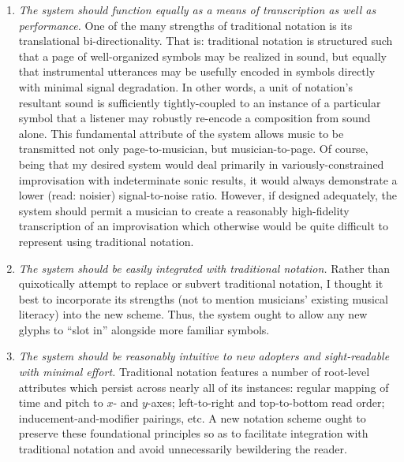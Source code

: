 \begin{enumerate}[label=(\roman*)]
        \item \textit{The system should function equally as a means of transcription as well as performance.}   One of the many strengths of traditional notation is its translational bi-directionality. That is: traditional notation is structured such that a page of well-organized symbols may be realized in sound, but equally that instrumental utterances may be usefully encoded in symbols directly with minimal signal degradation. In other words, a unit of notation's resultant sound is sufficiently tightly-coupled to an instance of a particular symbol that a listener may robustly re-encode a composition from sound alone. This fundamental attribute of the system allows music to be transmitted not only page-to-musician, but musician-to-page. Of course, being that my desired system would deal primarily in variously-constrained improvisation with indeterminate sonic results, it would always demonstrate a lower (read: noisier) signal-to-noise ratio. However, if designed adequately, the system should permit a musician to create a reasonably high-fidelity transcription of an improvisation which otherwise would be quite difficult to represent using traditional notation.
        
        \item \textit{The system should be easily integrated with traditional notation.} Rather than quixotically attempt to replace or subvert traditional notation, I thought it best to incorporate its strengths (not to mention musicians' existing musical literacy) into the new scheme. Thus, the system ought to allow any new glyphs to ``slot in'' alongside more familiar symbols.
        
        \item \textit{The system should be reasonably intuitive to new adopters and sight-readable with minimal effort.} Traditional notation features a number of root-level attributes which persist across nearly all of its instances: regular mapping of time and pitch to $x$- and $y$-axes; left-to-right and top-to-bottom read order; inducement-and-modifier pairings, etc. A new notation scheme ought to preserve these foundational principles so as to facilitate integration with traditional notation and avoid unnecessarily bewildering the reader. 
        
        

\end{enumerate}
